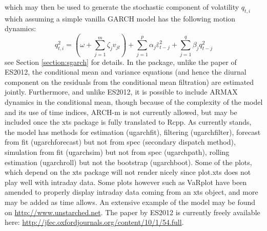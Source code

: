 which may then be used to generate the stochastic component of volatility $q_{t,i}$ which assuming a simple vanilla GARCH model has the following motion dynamics:
\begin{equation}\label{mcs4}
q_{t,i}^2 = \left( {\omega  + \sum\limits_{j = 1}^m {{\zeta _j}{v_{jt}}} } \right) + \sum\limits_{j = 1}^p {{\alpha _j}\bar \varepsilon _{t - j}^2 + } \sum\limits_{j = 1}^q {{\beta _j}q_{t - j}^2}
\end{equation}
see Section \ref{section:sgarch} for details.
In the \verb@rugarch@ package, unlike the paper of ES2012, the conditional mean and variance equations (and hence the diurnal component on the residuals from the conditional mean filtration) are estimated jointly. Furthermore, and unlike ES2012, it is possible to include ARMAX dynamics in the conditional mean, though because of the complexity of the model and its use of time indices, ARCH-m is not currently allowed, but may be included once the xts package is fully translated to Rcpp. As currently stands, the model has methods for estimation (ugarchfit), filtering (ugarchfilter), forecast from fit (ugarchforecast) but not from spec (secondary dispatch method), simulation from fit (ugarchsim) but not from spec (ugarchpath), rolling estimation (ugarchroll) but not the bootstrap (ugarchboot). Some of the plots, which depend on the xts package will not render nicely since plot.xts does not play well with intraday data. Some plots however such as VaRplot have been amended to properly display intraday data coming from an xts object, and more may be added as time allows. An extensive example of the model may be found on \url{http://www.unstarched.net}. 
The paper by ES2012 is currently freely available here: \url{http://jfec.oxfordjournals.org/content/10/1/54.full}.

